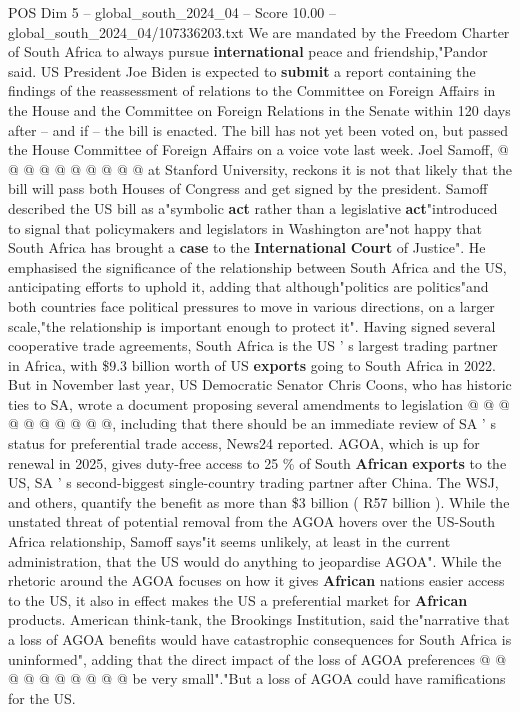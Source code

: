\begin{textsample}{POS Dim 5 – global\_south\_2024\_04 – Score 10.00 – global\_south\_2024\_04/107336203.txt}
We are mandated by the Freedom Charter of South Africa to always pursue \textbf{international} peace and friendship,"Pandor said.
US President Joe Biden is expected to \textbf{submit} a report containing the findings of the reassessment of relations to the Committee on Foreign Affairs in the House and the Committee on Foreign Relations in the Senate within 120 days after -- and if -- the bill is enacted.
The bill has not yet been voted on, but passed the House Committee of Foreign Affairs on a voice vote last week.
Joel Samoff, @ @ @ @ @ @ @ @ @ @ at Stanford University, reckons it is not that likely that the bill will pass both Houses of Congress and get signed by the president.
Samoff described the US bill as a"symbolic \textbf{act} rather than a legislative \textbf{act}"introduced to signal that policymakers and legislators in Washington are"not happy that South Africa has brought a \textbf{case} to the \textbf{International} \textbf{Court} of Justice".
He emphasised the significance of the relationship between South Africa and the US, anticipating efforts to uphold it, adding that although"politics are politics"and both countries face political pressures to move in various directions, on a larger scale,"the relationship is important enough to protect it".
Having signed several cooperative trade agreements, South Africa is the US ' s largest trading partner in Africa, with \$9.3 billion worth of US \textbf{exports} going to South Africa in 2022.
But in November last year, US Democratic Senator Chris Coons, who has historic ties to SA, wrote a document proposing several amendments to legislation @ @ @ @ @ @ @ @ @ @, including that there should be an immediate review of SA ' s status for preferential trade access, News24 reported.
AGOA, which is up for renewal in 2025, gives duty-free access to 25 \% of South \textbf{African} \textbf{exports} to the US, SA ' s second-biggest single-country trading partner after China.
The WSJ, and others, quantify the benefit as more than \$3 billion ( R57 billion ).
While the unstated threat of potential removal from the AGOA hovers over the US-South Africa relationship, Samoff says"it seems unlikely, at least in the current administration, that the US would do anything to jeopardise AGOA".
While the rhetoric around the AGOA focuses on how it gives \textbf{African} nations easier access to the US, it also in effect makes the US a preferential market for \textbf{African} products.
American think-tank, the Brookings Institution, said the"narrative that a loss of AGOA benefits would have catastrophic consequences for South Africa is uninformed", adding that the direct impact of the loss of AGOA preferences @ @ @ @ @ @ @ @ @ @ be very small"."But a loss of AGOA could have ramifications for the US.

\end{textsample}
